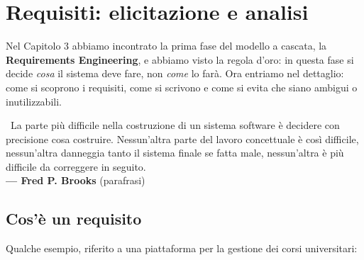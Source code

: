 \chapter{Requisiti: elicitazione e analisi}

Nel Capitolo 3 abbiamo incontrato la prima fase del modello a cascata, la \textbf{Requirements Engineering}, e abbiamo visto
la regola d'oro: in questa fase si decide \textit{cosa} il sistema deve fare, non \textit{come} lo farà.
Ora entriamo nel dettaglio: come si scoprono i requisiti, come si scrivono e come si evita che siano ambigui o inutilizzabili.

\begin{center}
\begin{tcolorbox}[enhanced, breakable=false, colback=primary!5, colframe=primary!70!black, boxrule=1pt, arc=3pt,
  width=0.92\textwidth, drop fuzzy shadow, fontupper=\itshape]
  \iquotel\ La parte più difficile nella costruzione di un sistema software è decidere con precisione cosa costruire.
  Nessun'altra parte del lavoro concettuale è così difficile, nessun'altra danneggia tanto il sistema finale se fatta male,
  nessun'altra è più difficile da correggere in seguito.\\[4pt]
  \normalfont\hfill\textbf{--- Fred P. Brooks} (parafrasi)
\end{tcolorbox}
\end{center}


\section{Cos'è un requisito}


Qualche esempio, riferito a una piattaforma per la gestione dei corsi universitari:

